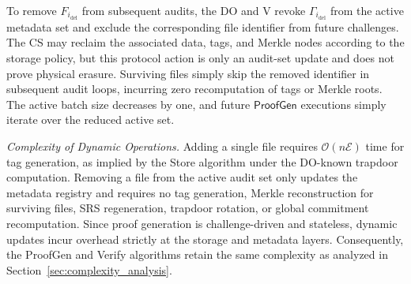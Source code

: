 \documentclass[lettersize,journal]{IEEEtran}
\newcommand{\CompExp}{\mathcal{E}}
\newcommand{\ProofGen}{\mathsf{ProofGen}}
\begin{document}
To remove $F_{i_{\text{del}}}$ from subsequent audits, the DO and V revoke $\Gamma_{i_{\text{del}}}$ from the active metadata set and exclude the corresponding file identifier from future challenges. The CS may reclaim the associated data, tags, and Merkle nodes according to the storage policy, but this protocol action is only an audit-set update and does not prove physical erasure. Surviving files simply skip the removed identifier in subsequent audit loops, incurring zero recomputation of tags or Merkle roots. The active batch size decreases by one, and future $\ProofGen$ executions simply iterate over the reduced active set.

\textit{Complexity of Dynamic Operations.} Adding a single file requires $\mathcal{O}(n\CompExp)$ time for tag generation, as implied by the \textsf{Store} algorithm under the DO-known trapdoor computation. Removing a file from the active audit set only updates the metadata registry and requires no tag generation, Merkle reconstruction for surviving files, SRS regeneration, trapdoor rotation, or global commitment recomputation. Since proof generation is challenge-driven and stateless, dynamic updates incur overhead strictly at the storage and metadata layers. Consequently, the \textsf{ProofGen} and \textsf{Verify} algorithms retain the same complexity as analyzed in Section~\ref{sec:complexity_analysis}.
\end{document}
